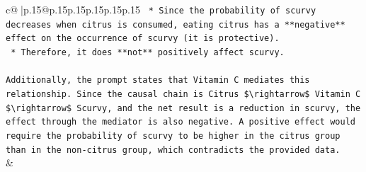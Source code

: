 \documentclass{article}
\begin{document}
{\begin{supertabular}{c@{$\;$}|p{.15\linewidth}@{}p{.15\linewidth}p{.15\linewidth}p{.15\linewidth}p{.15\linewidth}p{.15\linewidth}}
{{{\texttt{    *   Since the probability of scurvy decreases when citrus is consumed, eating citrus has a **negative** effect on the occurrence of scurvy (it is protective).} \\
\texttt{    *   Therefore, it does **not** positively affect scurvy.} \\
\\ 
\texttt{Additionally, the prompt states that Vitamin C mediates this relationship. Since the causal chain is Citrus \$\textbackslash{}rightarrow\$ Vitamin C \$\textbackslash{}rightarrow\$ Scurvy, and the net result is a reduction in scurvy, the effect through the mediator is also negative. A positive effect would require the probability of scurvy to be higher in the citrus group than in the non{-}citrus group, which contradicts the provided data.} \\
            }
        }
    }
    & \\ \\


\end{supertabular}}
\end{document}
